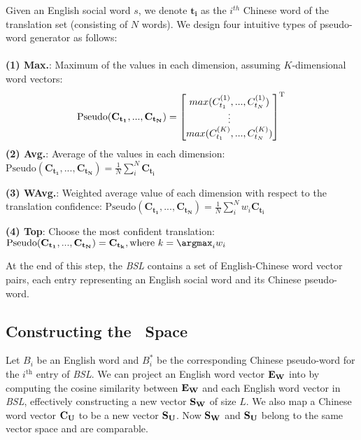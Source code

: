 Given an English social word $s$, we denote $\mathbf{t_i}$ as the $i^{th}$ Chinese word of the translation set (consisting of $N$ words).
We design four intuitive types of pseudo-word generator as follows:
~\\~\\
\textbf{(1) Max.}: Maximum of the values in each dimension, assuming $K$-dimensional word vectors:
\vspace{-10pt}
{\small \begin{equation*}
	\text{Pseudo}(\mathbf{C_{t_1}},...,\mathbf{C_{t_N}}) = \begin{bmatrix}
	max(C_{t_1}^{(1)},...,C_{t_N}^{(1)}) \\
	\vdots   \\
	max(C_{t_1}^{(K)},...,C_{t_N}^{(K)})
	\end{bmatrix}^{\rm T} \\
\end{equation*}}%
\noindent
\textbf{(2) Avg.}: Average of the values in each dimension:
{\footnotesize $
	\text{Pseudo}(\mathbf{C_{t_1}},...,\mathbf{C_{t_N}})=\frac{1}{N}\sum_i^N\mathbf{C_{t_i}} \
$}

\noindent
\textbf{(3) WAvg.}: Weighted average value of each dimension 
with respect to the translation confidence:
{\footnotesize $
	\text{Pseudo}(\mathbf{C_{t_1}},...,\mathbf{C_{t_N}})=\frac{1}{N}\sum_i^Nw_i \mathbf{C_{t_i}} \
$}

\noindent
\textbf{(4) Top}: Choose the most confident translation:
{\footnotesize $
	\text{Pseudo}(\mathbf{C_{t_1}},...,\mathbf{C_{t_N}}) = \mathbf{C_{t_k}}, \text{where } k = \argmax_i{w_i}
$}

At the end of this step, the \textit{BSL} contains a set of English-Chinese word vector pairs, each entry representing an English social word and its Chinese pseudo-word.


\subsection{Constructing the {\socvec}~Space}
\label{sec:pg}

Let $B_i$ be an English word and $B_i^*$ be
the corresponding Chinese pseudo-word for the $i^\text{th}$ entry of \textit{BSL}.  
We can project an English word vector $\bf{E_W}$ into \textit{\socvec} by 
computing the cosine similarity between $\bf{E_W}$ and each English
word vector in \textit{BSL}, effectively constructing a new vector
$\bf{S_W}$ of size $L$. 
We also map a Chinese word vector 
$\bf{C_U}$ to be a new vector $\bf{S_U}$. 
Now $\bf{S_W}$ and $\bf{S_U}$ belong to the same vector space \textit{\socvec} 
and are comparable. 

